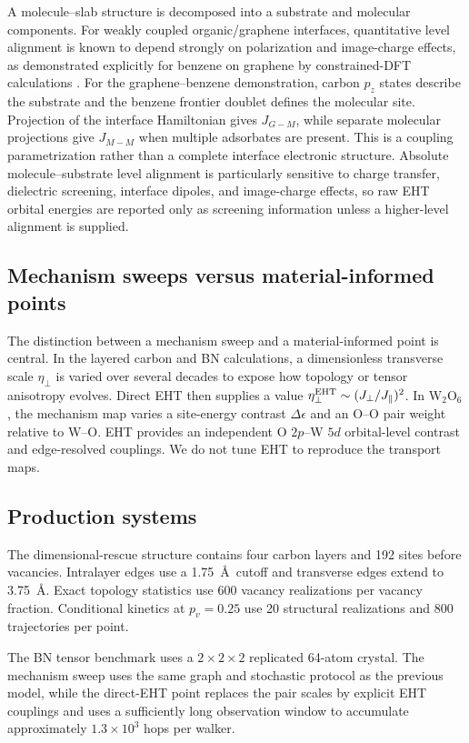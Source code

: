 \documentclass[aps,prmaterials,reprint,amsmath,amssymb,superscriptaddress,longbibliography]{revtex4-2}
\newcommand{\etaPerp}{\eta_{\perp}}
\begin{document}
A molecule--slab structure is decomposed into a substrate and molecular components. For weakly coupled organic/graphene interfaces, quantitative level alignment is known to depend strongly on polarization and image-charge effects, as demonstrated explicitly for benzene on graphene by constrained-DFT calculations \cite{roychoudhury2016}. For the graphene--benzene demonstration, carbon $p_z$ states describe the substrate and the benzene frontier doublet defines the molecular site. Projection of the interface Hamiltonian gives $J_{G-M}$, while separate molecular projections give $J_{M-M}$ when multiple adsorbates are present. This is a coupling parametrization rather than a complete interface electronic structure. Absolute molecule--substrate level alignment is particularly sensitive to charge transfer, dielectric screening, interface dipoles, and image-charge effects, so raw EHT orbital energies are reported only as screening information unless a higher-level alignment is supplied.

\subsection{Mechanism sweeps versus material-informed points}
The distinction between a mechanism sweep and a material-informed point is central. In the layered carbon and BN calculations, a dimensionless transverse scale $\etaPerp$ is varied over several decades to expose how topology or tensor anisotropy evolves. Direct EHT then supplies a value $\etaPerp^{\rm EHT}\sim(J_\perp/J_\parallel)^2$. In W$_2$O$_6$, the mechanism map varies a site-energy contrast $\Delta\epsilon$ and an O--O pair weight relative to W--O. EHT provides an independent O $2p$--W $5d$ orbital-level contrast and edge-resolved couplings. We do not tune EHT to reproduce the transport maps.

\subsection{Production systems}
The dimensional-rescue structure contains four carbon layers and 192 sites before vacancies. Intralayer edges use a 1.75~\AA\ cutoff and transverse edges extend to 3.75~\AA. Exact topology statistics use 600 vacancy realizations per vacancy fraction. Conditional kinetics at $p_v=0.25$ use 20 structural realizations and 800 trajectories per point.

The BN tensor benchmark uses a $2\times2\times2$ replicated 64-atom crystal. The mechanism sweep uses the same graph and stochastic protocol as the previous model, while the direct-EHT point replaces the pair scales by explicit EHT couplings and uses a sufficiently long observation window to accumulate approximately $1.3\times10^3$ hops per walker.
\end{document}

